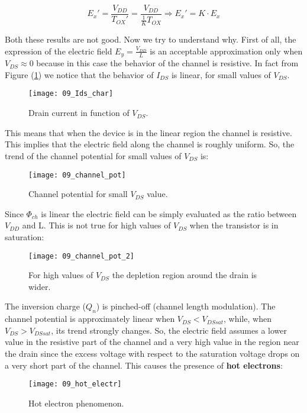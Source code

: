 \documentclass[a4paper, 12pt, twoside, openright]{report}
\begin{document}
\begin{enumerate}
	\begin{equation}
	E_x' = \frac{V_{DD}}{T_{OX}'} = \frac{V_{DD}}{\frac{1}{K}T_{OX}} \Rightarrow E_x' = K \cdot E_x
	\label{}
	\end{equation}

Both these results are not good. Now we try to understand why.
First of all, the expression of the electric field $E_y = \frac{V_{DD}}{L}$ is an acceptable approximation only when $V_{DS} \approx 0$ because in this case the behavior of the channel is resistive. In fact from Figure (\ref{ids}) we notice that the behavior of $I_{DS}$ is linear, for small values of $V_{DS}$.

	\begin{figure}[H]
	\centering
	\texttt{[image: 09\_Ids\_char]}
	\caption{Drain current in function of $V_{DS}$.}
	\label{ids}
	\end{figure}

This means that when the device is in the linear region the channel is resistive. This implies that the electric field along the channel is roughly uniform. So, the trend of the channel potential for small values of $V_{DS}$ is:

	\begin{figure}[H]
	\centering
	\texttt{[image: 09\_channel\_pot]}
	\caption{Channel potential for small $V_{DS}$ value.}
	\label{}
	\end{figure}

Since $\Phi_{ch}$ is linear the electric field can be simply evaluated as the ratio between $V_{DD}$ and L. This is not true for high values of $V_{DS}$ when the transistor is in saturation:

	\begin{figure}[H]
	\centering
	\texttt{[image: 09\_channel\_pot\_2]}
	\caption{For high values of $V_{DS}$ the depletion region around the drain is wider.}
	\label{}
	\end{figure}

The inversion charge ($Q_{n}$) is pinched-off (channel length modulation). The channel potential is approximately linear when $V_{DS} < V_{DSsat}$, while, when $V_{DS} > V_{DSsat}$, its trend strongly changes. So, the electric field assumes a lower value in the resistive part of the channel and a very high value in the region near the drain since the excess voltage with respect to the saturation voltage drops on a very short part of the channel. This causes the presence of \textbf{hot electrons}:

	\begin{figure}[H]
	\centering
	\texttt{[image: 09\_hot\_electr]}
	\caption{Hot electron phenomenon.}
	\label{}
	\end{figure}


\end{enumerate}
\end{document}
